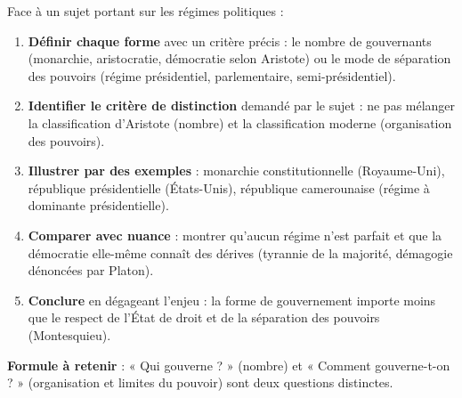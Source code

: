 \documentclass[11pt]{article}
\begin{document}
\begin{methode}
Face à un sujet portant sur les régimes politiques :
\begin{enumerate}
\item \textbf{Définir chaque forme} avec un critère précis : le nombre de gouvernants (monarchie, aristocratie, démocratie selon Aristote) ou le mode de séparation des pouvoirs (régime présidentiel, parlementaire, semi-présidentiel).
\item \textbf{Identifier le critère de distinction} demandé par le sujet : ne pas mélanger la classification d'Aristote (nombre) et la classification moderne (organisation des pouvoirs).
\item \textbf{Illustrer par des exemples} : monarchie constitutionnelle (Royaume-Uni), république présidentielle (États-Unis), république camerounaise (régime à dominante présidentielle).
\item \textbf{Comparer avec nuance} : montrer qu'aucun régime n'est parfait et que la démocratie elle-même connaît des dérives (tyrannie de la majorité, démagogie dénoncées par Platon).
\item \textbf{Conclure} en dégageant l'enjeu : la forme de gouvernement importe moins que le respect de l'État de droit et de la séparation des pouvoirs (Montesquieu).
\end{enumerate}
\textbf{Formule à retenir} : « Qui gouverne ? » (nombre) et « Comment gouverne-t-on ? » (organisation et limites du pouvoir) sont deux questions distinctes.
\end{methode}
\end{document}
